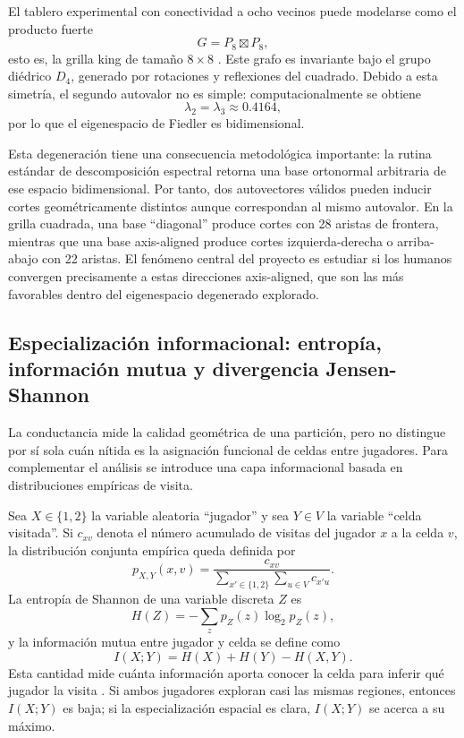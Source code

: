 \documentclass[conference]{IEEEtran}
\begin{document}
El tablero experimental con conectividad a ocho vecinos puede modelarse como el producto fuerte
\begin{equation}
G = P_8 \boxtimes P_8,
\end{equation}
esto es, la grilla king de tamaño $8\times 8$ \cite{hammack2011}. Este grafo es invariante bajo el grupo diédrico $D_4$, generado por rotaciones y reflexiones del cuadrado. Debido a esta simetría, el segundo autovalor no es simple: computacionalmente se obtiene
\begin{equation}
\lambda_2=\lambda_3 \approx 0.4164,
\end{equation}
por lo que el eigenespacio de Fiedler es bidimensional.

Esta degeneración tiene una consecuencia metodológica importante: la rutina estándar de descomposición espectral retorna una base ortonormal arbitraria de ese espacio bidimensional. Por tanto, dos autovectores válidos pueden inducir cortes geométricamente distintos aunque correspondan al mismo autovalor. En la grilla cuadrada, una base ``diagonal'' produce cortes con 28 aristas de frontera, mientras que una base axis-aligned produce cortes izquierda-derecha o arriba-abajo con 22 aristas. El fenómeno central del proyecto es estudiar si los humanos convergen precisamente a estas direcciones axis-aligned, que son las más favorables dentro del eigenespacio degenerado explorado.

\subsection{Especialización informacional: entropía, información mutua y divergencia Jensen-Shannon}

La conductancia mide la calidad geométrica de una partición, pero no distingue por sí sola cuán nítida es la asignación funcional de celdas entre jugadores. Para complementar el análisis se introduce una capa informacional basada en distribuciones empíricas de visita.

Sea $X \in \{1,2\}$ la variable aleatoria ``jugador'' y sea $Y \in V$ la variable ``celda visitada''. Si $c_{xv}$ denota el número acumulado de visitas del jugador $x$ a la celda $v$, la distribución conjunta empírica queda definida por
\begin{equation}
p_{X,Y}(x,v)=\frac{c_{xv}}{\sum_{x' \in \{1,2\}} \sum_{u \in V} c_{x'u}}.
\end{equation}
La entropía de Shannon de una variable discreta $Z$ es
\begin{equation}
H(Z)=-\sum_z p_Z(z)\log_2 p_Z(z),
\end{equation}
y la información mutua entre jugador y celda se define como
\begin{equation}
I(X;Y)=H(X)+H(Y)-H(X,Y).
\end{equation}
Esta cantidad mide cuánta información aporta conocer la celda para inferir qué jugador la visita \cite{cover2006}. Si ambos jugadores exploran casi las mismas regiones, entonces $I(X;Y)$ es baja; si la especialización espacial es clara, $I(X;Y)$ se acerca a su máximo.
\end{document}
